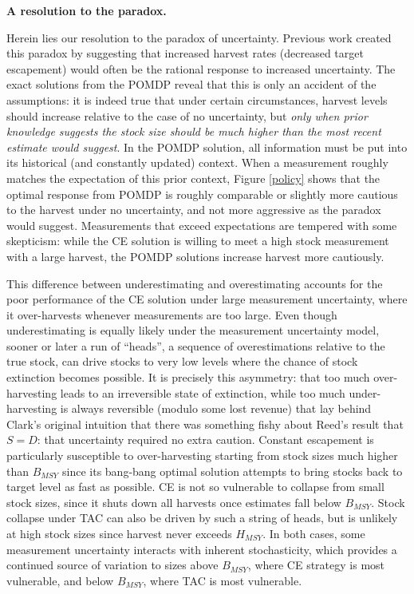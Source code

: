 \documentclass[3p]{elsarticle} %
\begin{document}
\textbf{A resolution to the paradox.}

Herein lies our resolution to the paradox of uncertainty. Previous work
created this paradox by suggesting that increased harvest rates
(decreased target escapement) would often be the rational response to
increased uncertainty. The exact solutions from the POMDP reveal that
this is only an accident of the assumptions: it is indeed true that
under certain circumstances, harvest levels should increase relative to
the case of no uncertainty, but \emph{only when prior knowledge suggests
the stock size should be much higher than the most recent estimate would
suggest}. In the POMDP solution, all information must be put into its
historical (and constantly updated) context. When a measurement roughly
matches the expectation of this prior context, Figure \ref{policy} shows
that the optimal response from POMDP is roughly comparable or slightly
more cautious to the harvest under no uncertainty, and not more
aggressive as the paradox would suggest. Measurements that exceed
expectations are tempered with some skepticism: while the CE solution is
willing to meet a high stock measurement with a large harvest, the POMDP
solutions increase harvest more cautiously.

This difference between underestimating and overestimating accounts for
the poor performance of the CE solution under large measurement
uncertainty, where it over-harvests whenever measurements are too large.
Even though underestimating is equally likely under the measurement
uncertainty model, sooner or later a run of ``heads'', a sequence of
overestimations relative to the true stock, can drive stocks to very low
levels where the chance of stock extinction becomes possible. It is
precisely this asymmetry: that too much over-harvesting leads to an
irreversible state of extinction, while too much under-harvesting is
always reversible (modulo some lost revenue) that lay behind Clark's
original intuition that there was something fishy about Reed's result
that \(S = D\): that uncertainty required no extra caution. Constant
escapement is particularly susceptible to over-harvesting starting from
stock sizes much higher than \(B_{MSY}\) since its bang-bang optimal
solution attempts to bring stocks back to target level as fast as
possible. CE is not so vulnerable to collapse from small stock sizes,
since it shuts down all harvests once estimates fall below \(B_{MSY}\).
Stock collapse under TAC can also be driven by such a string of heads,
but is unlikely at high stock sizes since harvest never exceeds
\(H_{MSY}\). In both cases, some measurement uncertainty interacts with
inherent stochasticity, which provides a continued source of variation
to sizes above \(B_{MSY}\), where CE strategy is most vulnerable, and
below \(B_{MSY}\), where TAC is most vulnerable.
\end{document}
